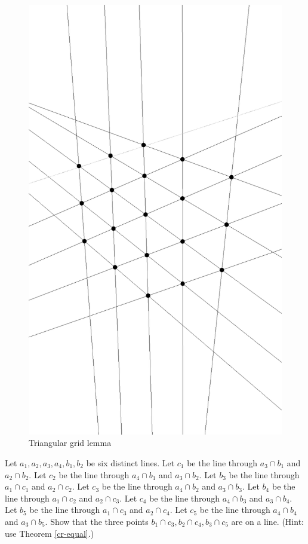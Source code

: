 \begin{figure}[!htb]
\centering
\includegraphics[scale=0.5,angle=270]{triangulargrid.eps}
\caption{Triangular grid lemma}
\end{figure}

\begin{exer} Let $a_1,a_2,a_3,a_4,b_1,b_2$ be six distinct lines. Let $c_1$ be the line through $a_3\cap b_1$ and $a_2\cap b_2$. Let $c_2$ be the line through $a_4\cap b_1$ and $a_3\cap b_2$. Let $b_3$ be the line through $a_1\cap c_1$ and $a_2\cap c_2$. Let $c_3$ be the line through $a_4\cap b_2$ and $a_3\cap b_3$. Let $b_4$ be the line through $a_1\cap c_2$ and $a_2\cap c_3$. Let $c_4$ be the line through $a_4\cap b_3$ and $a_3\cap b_4$. Let $b_5$ be the line through $a_1\cap c_3$ and $a_2\cap c_4$. Let $c_5$ be the line through $a_4\cap b_4$ and $a_3\cap b_5$. Show that the three points $b_1\cap c_3, b_2\cap c_4, b_3\cap c_5$ are on a line. (Hint: use Theorem \ref{cr-equal}.)
\end{exer}


